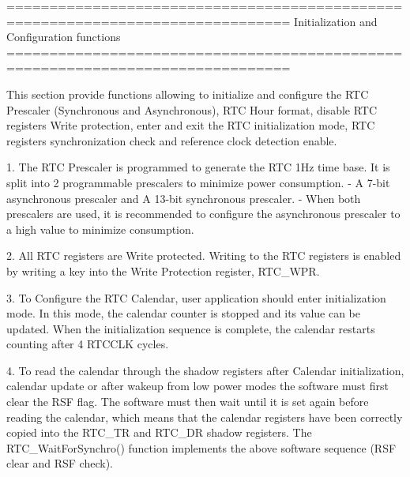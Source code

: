 \begin{DoxyVerb} ===============================================================================
                 Initialization and Configuration functions
 ===============================================================================

  This section provide functions allowing to initialize and configure the RTC
  Prescaler (Synchronous and Asynchronous), RTC Hour format, disable RTC registers
  Write protection, enter and exit the RTC initialization mode, RTC registers
  synchronization check and reference clock detection enable.
  
  1. The RTC Prescaler is programmed to generate the RTC 1Hz time base. It is
     split into 2 programmable prescalers to minimize power consumption.
     - A 7-bit asynchronous prescaler and A 13-bit synchronous prescaler.
     - When both prescalers are used, it is recommended to configure the asynchronous
       prescaler to a high value to minimize consumption.

  2. All RTC registers are Write protected. Writing to the RTC registers
     is enabled by writing a key into the Write Protection register, RTC_WPR.

  3. To Configure the RTC Calendar, user application should enter initialization
     mode. In this mode, the calendar counter is stopped and its value can be 
     updated. When the initialization sequence is complete, the calendar restarts 
     counting after 4 RTCCLK cycles.

  4. To read the calendar through the shadow registers after Calendar initialization,
     calendar update or after wakeup from low power modes the software must first 
     clear the RSF flag. The software must then wait until it is set again before 
     reading the calendar, which means that the calendar registers have been 
     correctly copied into the RTC_TR and RTC_DR shadow registers.
     The RTC_WaitForSynchro() function implements the above software sequence 
     (RSF clear and RSF check).\end{DoxyVerb}
 

